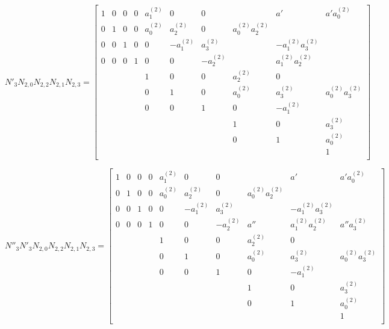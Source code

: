 \documentclass{article}
\begin{document}
\[
N'_3N_{2,0}N_{2,2}N_{2,1}N_{2,3}=
  \begin{bmatrix}
    1 & 0 & 0 & 0 & a_1^{(2)} & 0 & 0 &  & a' & a'a_0^{(2)} \\
    0 & 1 & 0 & 0 & a_0^{(2)} & a_2^{(2)} & 0 & a_0^{(2)}a_2^{(2)} &  &  \\
    0 & 0 & 1 & 0 & 0 & -a_1^{(2)} & a_3^{(2)} &  & -a_1^{(2)}a_3^{(2)} &  \\
    0 & 0 & 0 & 1 & 0 & 0 & -a_2^{(2)} &  & a_1^{(2)}a_2^{(2)} &  \\
    & & & & 1 & 0 & 0 & a_2^{(2)} & 0 &  \\
    & & & & 0 & 1 & 0 & a_0^{(2)} & a_3^{(2)} & a_0^{(2)}a_3^{(2)}\\
    & & & & 0 & 0 & 1 & 0 & -a_1^{(2)} &  \\
    & & & & & & & 1 & 0 & a_3^{(2)} \\
    & & & & & & & 0 & 1 & a_0^{(2)} \\
    & & & & & & & & & 1 \\
  \end{bmatrix}
\]

\[
N''_3N'_3N_{2,0}N_{2,2}N_{2,1}N_{2,3}=
  \begin{bmatrix}
    1 & 0 & 0 & 0 & a_1^{(2)} & 0 & 0 &  & a' & a'a_0^{(2)} \\
    0 & 1 & 0 & 0 & a_0^{(2)} & a_2^{(2)} & 0 & a_0^{(2)}a_2^{(2)} &  &  \\
    0 & 0 & 1 & 0 & 0 & -a_1^{(2)} & a_3^{(2)} &  & -a_1^{(2)}a_3^{(2)} &  \\
    0 & 0 & 0 & 1 & 0 & 0 & -a_2^{(2)} & a'' & a_1^{(2)}a_2^{(2)} & a''a_3^{(2)} \\
    & & & & 1 & 0 & 0 & a_2^{(2)} & 0 &  \\
    & & & & 0 & 1 & 0 & a_0^{(2)} & a_3^{(2)} & a_0^{(2)}a_3^{(2)}\\
    & & & & 0 & 0 & 1 & 0 & -a_1^{(2)} &  \\
    & & & & & & & 1 & 0 & a_3^{(2)} \\
    & & & & & & & 0 & 1 & a_0^{(2)} \\
    & & & & & & & & & 1 \\
  \end{bmatrix}
\]
\end{document}

